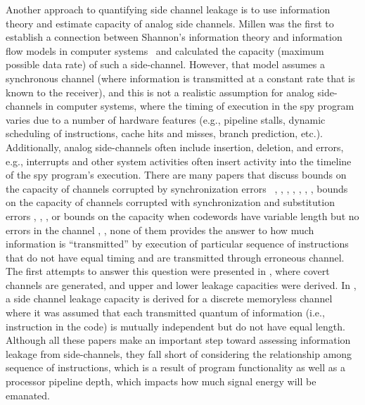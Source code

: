 \documentclass[11 pt]{article}
\begin{document}
Another approach to quantifying side channel leakage is to use information theory and estimate capacity of analog side channels. Millen was the first to establish a connection between Shannon's information theory and information flow models in computer systems~\cite{Millen87}
and calculated the capacity (maximum possible data rate) of such a side-channel.
However, that model assumes a synchronous channel (where information is transmitted at a constant rate that is known to the receiver),
and this is not a realistic assumption for analog side-channels in computer systems, where the timing of execution in the spy program varies
due to a number of hardware features (e.g., pipeline stalls, dynamic scheduling of instructions, cache hits and misses, branch prediction, etc.).
Additionally, analog side-channels often include insertion, deletion, and errors, e.g., interrupts and other system activities often insert activity into the timeline of the spy program's execution. There are many papers that discuss bounds on the capacity of channels corrupted by synchronization errors
~\cite{Wang05}, \cite{Anderson98}, \cite{Crespi13}, \cite{Davey01}, \cite{Ramachandran11}, \cite{Kirsch10}, \cite{Hu10}, bounds on the capacity of channels corrupted with synchronization and substitution errors \cite{Verdu10}, \cite{Duman13}, \cite{Tarokh12}, or bounds on the capacity when codewords have variable length but no errors in the channel \cite{Verdu10}, \cite{Shannon:InfoPaper}, none of them provides the answer to how much information is ``transmitted'' by execution of particular sequence of instructions that do not have equal timing and are transmitted through erroneous channel.
The first attempts to answer this question were presented in \cite{baki18icassp,baki18milcom}, where covert channels are generated, and upper and lower leakage capacities were derived. In \cite{baki17}, a side channel leakage capacity is derived for a discrete memoryless channel where it was assumed that each transmitted quantum of information (i.e., instruction in the code) is mutually independent but do not have equal length. Although all these papers make an important step toward assessing information leakage from side-channels, they fall short of considering the relationship among sequence of instructions, which is a result of program functionality as well as a processor pipeline depth, which impacts how much signal energy will be emanated.
\end{document}
